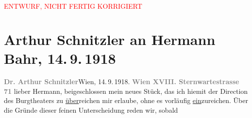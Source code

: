 
\begin{center}
            \textcolor{red}{ENTWURF, NICHT FERTIG KORRIGIERT}
                      \end{center}
            
         
         \renewcommand{\erwaehntePersonen}{Personen: Leopold von Andrian-Werburg, Hermann Bahr, Clemens von Franckenstein, Robert Michel, Max von Millenkovich, Max Reinhardt}
         \renewcommand{\erwaehnteInstitutionen}{Institutionen: Burgtheater, Königliche Hof- und Nationaltheater München}
         \renewcommand{\erwaehnteOrte}{Orte: München, Partenkirchen, Sternwartestraße, Wien}
         \renewcommand{\erwaehnteWerke}{Werke: Die Schwestern oder Casanova in Spa. Lustspiel in Versen}
               \section[Arthur Schnitzler an Hermann Bahr, 14. 9. 1918]{ Arthur Schnitzler an Hermann Bahr, 14. 9. 1918}\nopagebreak{}\rehead{ }\begin{ledgroupsized}[t]{13cm}\normalsize\beginnumbering \toendnotes[C]{\smallbreak\pagebreak[2]} 
\toendnotes[C]{\smallbreak}\pstart
           \textcolor{gray}{\textbf{{\pb}Dr. Arthur Schnitzler}}\hfill Wien, 14. 9. 1918.\pend
           \pstart
           \textcolor{gray}{\textbf{Wien XVIII. Sternwartestrasse 71}}\pend
           \pstart
           lieber Hermann, beigeschlossen mein neues Stück, das ich hiemit der Direction des Burgtheaters zu \uline{über}reichen mir erlaube, ohne es vorläufig \uline{ein}zureichen. Über die Gründe dieser feinen Unterscheidung reden wir, sobald

\end{ledgroupsized}
